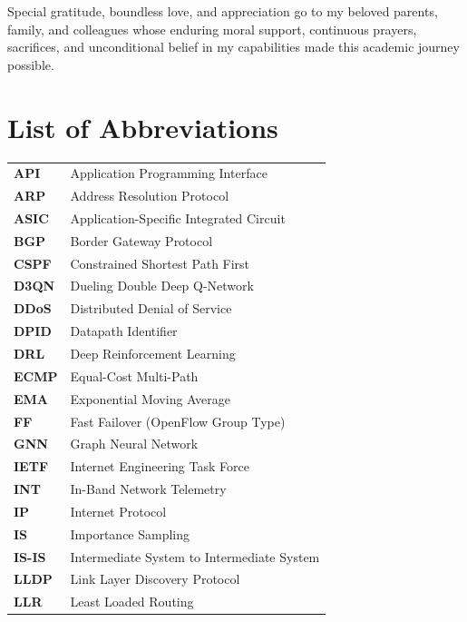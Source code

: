 \documentclass[12pt,a4paper,oneside]{report}
\begin{document}
Special gratitude, boundless love, and appreciation go to my beloved parents, family, and colleagues whose enduring moral support, continuous prayers, sacrifices, and unconditional belief in my capabilities made this academic journey possible.

\newpage

\tableofcontents
\listoffigures
\listoftables
\listofalgorithms

\newpage

\chapter*{List of Abbreviations}

\begin{tabular}{ll}
\textbf{API} & Application Programming Interface \\
\textbf{ARP} & Address Resolution Protocol \\
\textbf{ASIC} & Application-Specific Integrated Circuit \\
\textbf{BGP} & Border Gateway Protocol \\
\textbf{CSPF} & Constrained Shortest Path First \\
\textbf{D3QN} & Dueling Double Deep Q-Network \\
\textbf{DDoS} & Distributed Denial of Service \\
\textbf{DPID} & Datapath Identifier \\
\textbf{DRL} & Deep Reinforcement Learning \\
\textbf{ECMP} & Equal-Cost Multi-Path \\
\textbf{EMA} & Exponential Moving Average \\
\textbf{FF} & Fast Failover (OpenFlow Group Type) \\
\textbf{GNN} & Graph Neural Network \\
\textbf{IETF} & Internet Engineering Task Force \\
\textbf{INT} & In-Band Network Telemetry \\
\textbf{IP} & Internet Protocol \\
\textbf{IS} & Importance Sampling \\
\textbf{IS-IS} & Intermediate System to Intermediate System \\
\textbf{LLDP} & Link Layer Discovery Protocol \\
\textbf{LLR} & Least Loaded Routing \\

\end{tabular}
\end{document}
